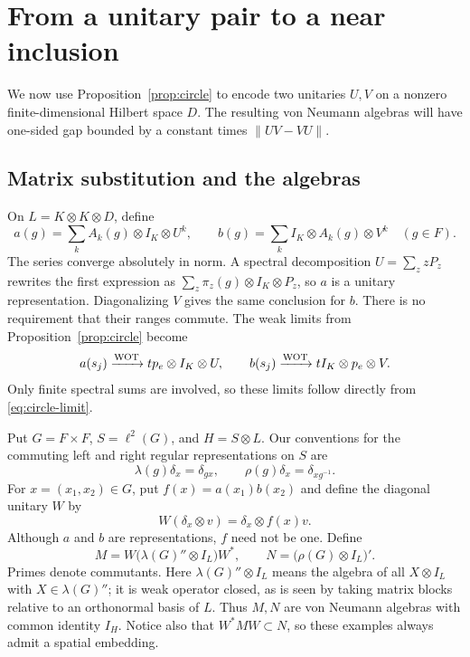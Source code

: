 \section{From a unitary pair to a near inclusion}\label{sec:near}

We now use Proposition~\ref{prop:circle} to encode two unitaries
$U,V$ on a nonzero finite-dimensional Hilbert space $D$. The resulting
von Neumann algebras will have one-sided gap bounded by a constant
times $\|UV-VU\|$.

\subsection{Matrix substitution and the algebras}
On $L=K\otimes K\otimes D$, define
\begin{equation}\label{eq:matrix-reps}
 a(g)=\sum_k A_k(g)\otimes I_K\otimes U^k,
 \qquad
 b(g)=\sum_k I_K\otimes A_k(g)\otimes V^k
 \quad(g\in F).
\end{equation}
The series converge absolutely in norm. A spectral decomposition
$U=\sum_z zP_z$ rewrites the first expression as
$\sum_z\pi_z(g)\otimes I_K\otimes P_z$, so $a$ is a unitary
representation. Diagonalizing $V$ gives the same conclusion for $b$.
There is no requirement that their ranges commute. The weak limits
from Proposition~\ref{prop:circle} become
\begin{equation}\label{eq:matrix-limits}
 a(s_j)\xrightarrow{\mathrm{WOT}}t p_e\otimes I_K\otimes U,
 \qquad
 b(s_j)\xrightarrow{\mathrm{WOT}}t I_K\otimes p_e\otimes V.
\end{equation}
Only finite spectral sums are involved, so these limits follow
directly from \eqref{eq:circle-limit}.

Put $G=F\times F$, $S=\ell^2(G)$, and $H=S\otimes L$.
Our conventions for the commuting left and right regular
representations on $S$ are
\[
 \lambda(g)\delta_x=\delta_{gx},\qquad
 \rho(g)\delta_x=\delta_{xg^{-1}}.
\]
For $x=(x_1,x_2)\in G$, put $f(x)=a(x_1)b(x_2)$ and define the
diagonal unitary $W$ by
\[
 W(\delta_x\otimes v)=\delta_x\otimes f(x)v.
\]
Although $a$ and $b$ are representations, $f$ need not be one.
Define
\begin{equation}\label{eq:algebras}
 M=W\bigl(\lambda(G)''\otimes I_L\bigr)W^*,
 \qquad N=\bigl(\rho(G)\otimes I_L\bigr)'.
\end{equation}
Primes denote commutants. Here $\lambda(G)''\otimes I_L$ means
the algebra of all $X\otimes I_L$ with $X\in\lambda(G)''$;
it is weak operator closed, as is seen by taking matrix blocks
relative to an orthonormal basis of $L$. Thus $M,N$ are von Neumann
algebras with common identity $I_H$. Notice also that
$W^*MW\subset N$, so these examples always admit a spatial embedding.

